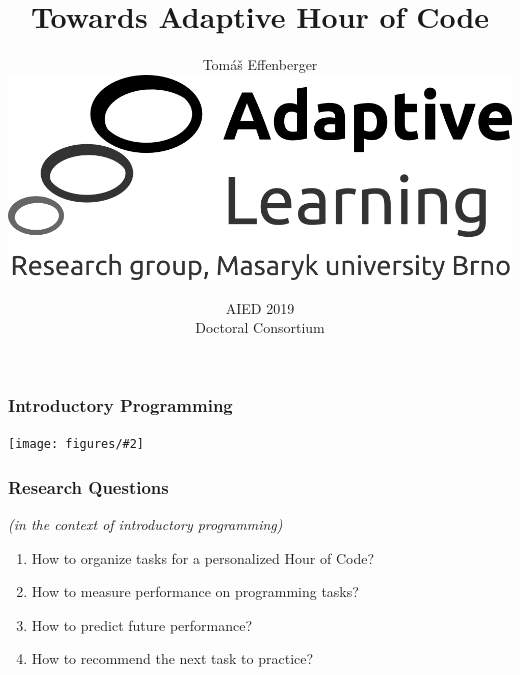 \documentclass[bigger]{beamer}
\title{Towards Adaptive Hour of Code}
\author{Tom\'a\v{s} Effenberger\\[4mm]
\includegraphics[width=.3\linewidth]{figures/al-logo}\\[6mm]
}
\date{AIED 2019\\Doctoral Consortium}
\newcommand{\img}[2]{
  \begin{center}
    \texttt{[image: figures/\#2]}
  \end{center}
}
\begin{document}
\frame{\titlepage}

\begin{frame}
  \frametitle{Introductory Programming}


  \img{0.6}{robomission-on-yellow-to-left}

\end{frame}


\begin{frame}
  \frametitle{Research Questions}

  \emph{(in the context of introductory programming)}
  \begin{enumerate}
  \item How to organize tasks for a personalized Hour of Code?

  \item How to measure performance on programming tasks?

  \item How to predict future performance?

  \item How to recommend the next task to practice?
  \end{enumerate}


\end{frame}
\end{document}
